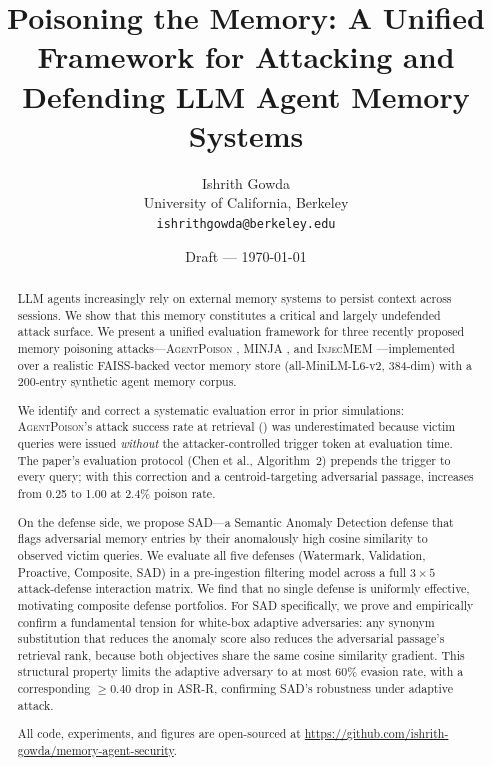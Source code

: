 \documentclass[10pt]{article}
\title{%
  \textbf{Poisoning the Memory: A Unified Framework for Attacking and\\
  Defending LLM Agent Memory Systems}
}
\author{%
  Ishrith Gowda\\
  University of California, Berkeley\\
  \texttt{ishrithgowda@berkeley.edu}
}
\date{Draft --- \today}
\newcommand{\asrr}{\text{ASR-R}}
\newcommand{\sad}{\textsc{SAD}}
\newcommand{\agentpoison}{\textsc{AgentPoison}}
\newcommand{\minja}{\textsc{MINJA}}
\newcommand{\injecmem}{\textsc{InjecMEM}}
\begin{document}
\maketitle

\begin{abstract}
LLM agents increasingly rely on external memory systems to persist context
across sessions.  We show that this memory constitutes a critical and largely
undefended attack surface.  We present a unified evaluation framework for
three recently proposed memory poisoning attacks---\agentpoison{}
\citep{chen2024agentpoison}, \minja{} \citep{dong2025minja}, and
\injecmem{} \citep{injecmem2026}---implemented over a realistic FAISS-backed
vector memory store (all-MiniLM-L6-v2, 384-dim) with a 200-entry synthetic
agent memory corpus.

We identify and correct a systematic evaluation error in prior simulations:
\agentpoison{}'s attack success rate at retrieval (\asrr) was underestimated
because victim queries were issued \emph{without} the attacker-controlled
trigger token at evaluation time.  The paper's evaluation protocol
(Chen et al., Algorithm~2) prepends the trigger to every query;
with this correction and a centroid-targeting adversarial passage,
\asrr{} increases from 0.25 to 1.00 at 2.4\% poison rate.

On the defense side, we propose \sad{}---a Semantic Anomaly Detection
defense that flags adversarial memory entries by their anomalously high
cosine similarity to observed victim queries.  We evaluate all five defenses
(Watermark, Validation, Proactive, Composite, \sad{}) in a pre-ingestion
filtering model across a full $3 \times 5$ attack-defense interaction matrix.
We find that no single defense is uniformly effective, motivating composite
defense portfolios.  For \sad{} specifically, we prove and empirically confirm
a fundamental tension for white-box adaptive adversaries: any synonym
substitution that reduces the anomaly score also reduces the adversarial
passage's retrieval rank, because both objectives share the same cosine
similarity gradient.  This structural property limits the adaptive adversary
to at most 60\% evasion rate, with a corresponding $\geq 0.40$ drop in
ASR-R, confirming \sad{}'s robustness under adaptive attack.

All code, experiments, and figures are open-sourced at
\url{https://github.com/ishrith-gowda/memory-agent-security}.
\end{abstract}













\appendix

\end{document}
